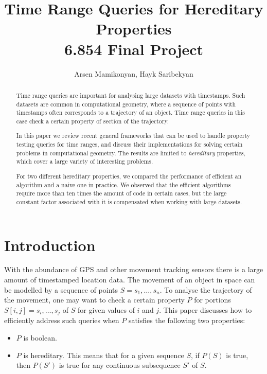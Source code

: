 \documentclass{article}
\begin{document}
\title{Time Range Queries for Hereditary Properties \\ \large 6.854 Final Project}
\author{Arsen Mamikonyan, Hayk Saribekyan}

\maketitle

\begin{abstract}
    Time range queries are important for analysing large datasets with timestamps. Such datasets are common in computational geometry, where a sequence of points with timestamps often corresponds to a trajectory of an object. Time range queries in this case check a certain property of section of the trajectory.
    
    In this paper we review recent general frameworks that can be used to handle property testing queries for time ranges, and discuss their implementations for solving certain problems in computational geometry. The results are limited to \textit{hereditary} properties, which cover a large variety of interesting problems.
    
    For two different hereditary properties, we compared the performance of efficient an algorithm and a naive one in practice. We observed that the efficient algorithms require more than ten times the amount of code in certain cases, but the large constant factor associated with it is compensated when working with large datasets.
\end{abstract}

\section{Introduction}
\label{sec:intro}
With the abundance of GPS and other movement tracking sensors there is a large amount of timestamped location data. The movement of an object in space can be modelled by a sequence of points $S = s_1, \dots, s_n$. To analyse the trajectory of the movement, one may want to check a certain property $P$ for portions $S[i, j] = s_i, \dots, s_j$ of $S$ for given values of $i$ and $j$. This paper discusses how to efficiently address such queries when $P$ satisfies the following two properties:
\begin{itemize}
    \item $P$ is boolean.
    \item $P$ is hereditary. This means that for a given sequence $S$, if $P(S)$ is true, then $P(S')$ is true for any continuous subsequence $S'$ of $S$.
\end{itemize}
\end{document}

